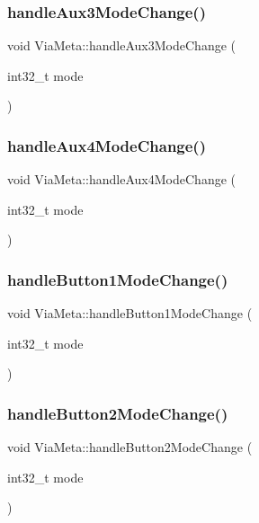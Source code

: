 \subsubsection{\texorpdfstring{handle\+Aux3\+Mode\+Change()}{handleAux3ModeChange()}}
{\footnotesize\ttfamily void Via\+Meta\+::handle\+Aux3\+Mode\+Change (\begin{DoxyParamCaption}\item[{int32\+\_\+t}]{mode }\end{DoxyParamCaption})}

\mbox{\label{class_via_meta_af5912a56e45c8bf6e1c6412cfbae3179}} 
\subsubsection{\texorpdfstring{handle\+Aux4\+Mode\+Change()}{handleAux4ModeChange()}}
{\footnotesize\ttfamily void Via\+Meta\+::handle\+Aux4\+Mode\+Change (\begin{DoxyParamCaption}\item[{int32\+\_\+t}]{mode }\end{DoxyParamCaption})}

\mbox{\label{class_via_meta_a7cc6b36d441268ecdd939bc619b544b7}} 
\subsubsection{\texorpdfstring{handle\+Button1\+Mode\+Change()}{handleButton1ModeChange()}}
{\footnotesize\ttfamily void Via\+Meta\+::handle\+Button1\+Mode\+Change (\begin{DoxyParamCaption}\item[{int32\+\_\+t}]{mode }\end{DoxyParamCaption})}

\mbox{\label{class_via_meta_a6214bd154f0bad9b3a3a164cf2c86a37}} 
\subsubsection{\texorpdfstring{handle\+Button2\+Mode\+Change()}{handleButton2ModeChange()}}
{\footnotesize\ttfamily void Via\+Meta\+::handle\+Button2\+Mode\+Change (\begin{DoxyParamCaption}\item[{int32\+\_\+t}]{mode }\end{DoxyParamCaption})}

